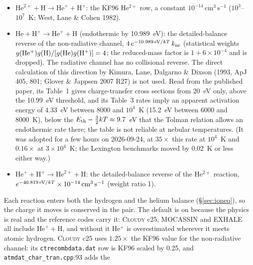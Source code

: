 \documentclass[english,a4paper]{my_memo}
\newcommand{\code}[1]{\texttt{#1}}
\newcommand{\cmc}{\mathrm{cm^{3}\,s^{-1}}}
\begin{document}
\begin{itemize}
  Zygelman's singlet-conditional rate without the 1/4, and below
  $2\times10^4$~K it exceeds the bound Zygelman's own Figure~8 sets by at
  least 11, so no constant factor could mend it
  (\code{md/heii\_h\_charge\_exchange/}).  At 8000~K the two channels now
  give $2.73{\times}10^{-15}$ and $9.7{\times}10^{-17}\,\cmc$ (the KF96 row gave
  $6.8{\times}10^{-15}$).
\item $\mathrm{He}^{2+} + \mathrm{H} \to \mathrm{He}^+ + \mathrm{H}^+$:
  the KF96 He$^{2+}$ row, a constant $10^{-14}\,\cmc$ ($10^3$--$10^7$~K;
  West, Lane \& Cohen 1982).
\item $\mathrm{He} + \mathrm{H}^+ \to \mathrm{He}^+ + \mathrm{H}$ (endothermic
  by 10.989~eV): the detailed-balance reverse of the non-radiative channel,
  $4\,e^{-10.989\,{\rm eV}/kT}\,k_{\rm nr}$ (statistical weights
  $g({\rm He^+})g({\rm H})/[g({\rm He})g({\rm H^+})] = 4$; the reduced-mass
  factor is $1 + 6{\times}10^{-4}$ and is dropped).  The radiative channel
  has no collisional reverse.  The direct calculation of this direction by
  Kimura, Lane, Dalgarno \& Dixson (1993, ApJ 405, 801; Glover \& Jappsen
  2007 R27) is not used.  Read from the published paper, its Table~1 gives
  charge-transfer cross sections from 20~eV only, above the 10.99~eV
  threshold, and its Table~3 rates imply an apparent activation energy of
  4.33~eV between 8000 and $10^4$~K (15.2~eV between 6000 and 8000~K),
  below the $E_{\rm th} - \frac{3}{2}kT \approx 9.7$~eV that the Tolman
  relation allows an endothermic rate there; the table is not reliable at
  nebular temperatures.  (It was adopted for a few hours on 2026-09-24, at
  $35\times$ this rate at $10^4$~K and $0.16\times$ at $3{\times}10^4$~K;
  the Lexington benchmarks moved by 0.02~K or less either way.)
\item $\mathrm{He}^+ + \mathrm{H}^+ \to \mathrm{He}^{2+} + \mathrm{H}$: the
  detailed-balance reverse of the He$^{2+}$ reaction,
  $e^{-40.819\,{\rm eV}/kT}\times 10^{-14}\,\cmc$ (weight ratio 1).
\end{itemize}
Each reaction enters both the hydrogen and the helium balance
(\S\ref{sec:ioneq}), so the charge it moves is conserved in the pair.  The
default is on because the physics is real and the reference codes carry it:
\textsc{Cloudy} c25, MOCASSIN and EXHALE all include
$\mathrm{He}^+ + \mathrm{H}$, and without it He$^+$ is overestimated
wherever it meets atomic hydrogen.  \textsc{Cloudy} c25 uses $1.25\times$
the KF96 value for the non-radiative channel: its \code{ctrecombdata.dat}
row is KF96 scaled by 0.25, and \code{atmdat\_char\_tran.cpp}:93 adds the
\end{document}
